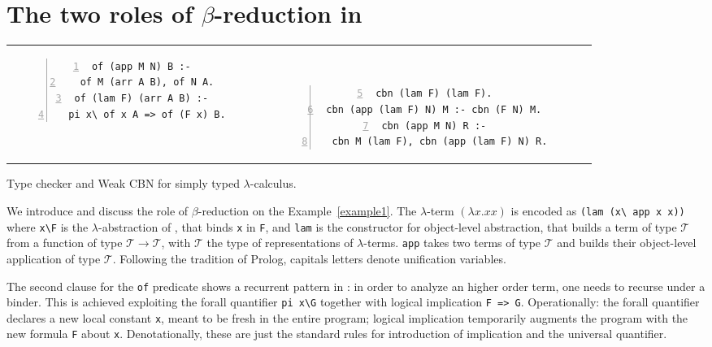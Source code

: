 \documentclass{llncs}
\begin{document}

\section{The two roles of $\beta$-reduction in \lp{}}
\label{sec:beta}

\begin{example}[b]
\begin{center}
\begin{tabular}{cc}
\begin{minipage}{4.8cm}
\begin{Verbatim}[numbers=left,numbersep=1pt,frame=leftline]
of (app M N) B :-
  of M (arr A B), of N A.
of (lam F) (arr A B) :-
  pi x\ of x A => of (F x) B.
\end{Verbatim}
\end{minipage}~~
&
~~~\begin{minipage}{6.5cm}
\begin{Verbatim}[numbers=left,firstnumber=5,numbersep=1pt,frame=leftline]
cbn (lam F) (lam F).
cbn (app (lam F) N) M :- cbn (F N) M.
cbn (app M N) R :-
  cbn M (lam F), cbn (app (lam F) N) R.
\end{Verbatim}
\end{minipage}
\end{tabular}
\end{center}
\caption{\label{example1} Type checker and Weak CBN for simply typed $\lambda$-calculus.}
\end{example}

We introduce \lp{} and discuss the role of $\beta$-reduction on the
Example~\ref{example1}. The $\lambda$-term %
$(\lambda x.xx)$ is encoded %
as \verb+(lam (x\ app x x))+ where \verb+x\F+ is
the $\lambda$-abstraction of \lp{}, that binds \verb+x+ in \verb+F+, and
\verb+lam+ is the constructor for object-level abstraction, that builds
a term of type $\mathcal{T}$ from a function of type
$\mathcal{T} \to \mathcal{T}$, with $\mathcal{T}$ the type of representations
of $\lambda$-terms. \verb+app+ takes two terms of type $\mathcal{T}$ and builds
their object-level application of type $\mathcal{T}$.  Following the tradition of Prolog, capitals letters denote unification variables.

The second clause for the \verb+of+ predicate shows a recurrent pattern in
\lp: in order to analyze an higher order term, one needs to recurse
under a binder. This is achieved
exploiting the forall quantifier \verb+pi x\G+ together with logical
implication \verb+F => G+. Operationally: the forall quantifier declares a
new local constant \verb+x+, meant to be fresh in the entire program;
logical implication temporarily
augments the program with the new formula \verb+F+ about \verb+x+.
Denotationally, these are just the standard rules for introduction of
implication and the universal quantifier.
\end{document}
